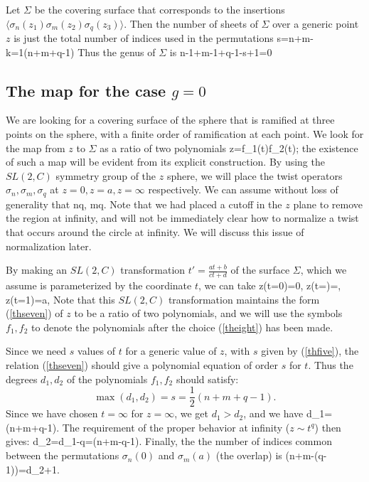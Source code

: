 \documentclass[12pt]{article}
\begin{document}
Let $\Sigma$ be the covering surface that corresponds to the insertions \\
$\langle\sigma_n(z_1)\sigma_m(z_2)\sigma_q(z_3)\rangle$. Then  the
number of sheets of $\Sigma$ over a generic point $z$
is just the total number of indices used in the permutations
\be\label{NumberOfSheets}
s=n+m-k={1}(n+m+q-1)
\label{thfive}
\ee
Thus the genus of $\Sigma$ is
\be\label{GenusG=0}
{n-1}+{m-1}+{q-1}-s+1=0
\label{thsix}
\ee

\subsection{The map for the case $g=0$}

We are looking for a covering surface of the sphere that is ramified
at three points on the sphere, with a finite order of
ramification at each point.  We look for the map from $z$ to
$\Sigma$  as a ratio of two polynomials
\be
z={f_1(t)\over f_2(t)};
\label{thseven}
\ee
the existence of such a  map will be evident from its explicit construction.
By using the $SL(2,C)$ symmetry group of the $z$ sphere, we will
place the twist operators $\sigma_n, \sigma_m, \sigma_q$
at
$z=0, z=a, z=\infty$ respectively.  We can assume without loss of
generality that
\be\label{orderchoise}
n\le q, \qquad m\le q.
\ee
Note that we had placed a cutoff in the $z$
plane to remove the region at infinity, and  will not be immediately
clear how to normalize a twist that occurs around  the
circle at infinity.  We will discuss this issue of normalization later.

By making an $SL(2,C)$ transformation $t'=\frac{at+b}{ct+d}$ of the
surface $\Sigma$, which we assume is parameterized by
the coordinate $t$, we can take
\be
z(t=0)=0, \qquad z(t=\infty)=\infty, \qquad z(t=1)=a,
\label{theight}
\ee
Note that this $SL(2,C)$ transformation maintains the form
(\ref{thseven}) of $z$ to be a ratio of two polynomials, and we
will use the symbols $f_1, f_2$ to denote the polynomials after the
choice  (\ref{theight}) has been made.

Since we need  $s$ values of $t$ for a generic value of $z$, with
$s$ given by (\ref{thfive}), the relation (\ref{thseven})
should give a polynomial equation of order $s$ for $t$.
Thus the  degrees  $d_1, d_2$ of the polynomials $f_1, f_2$ should satisfy:
$$
\max(d_1,d_2)=s=\frac{1}{2}(n+m+q-1).
$$
Since we have chosen $t=\infty$ for $z=\infty$, we get $d_1>d_2$,  and we
have
\be\label{expr_d1}
d_1=(n+m+q-1).
\ee
The requirement of the proper behavior at infinity ($z\sim t^q$) then gives:
\be\label{expr_d2}
d_2=d_1-q=(n+m-q-1).
\ee
Finally, the the number of indices common between the permutations
$\sigma_n(0)$ and
$\sigma_m(a)$  (the overlap) is
\be
{}(n+m-(q-1))=d_2+1.
\ee
\end{document}
